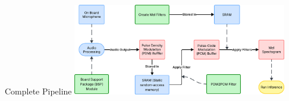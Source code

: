 \begin{frame}{Complete Pipeline}
    \centering
    \includegraphics[height=0.7\textheight,width=0.7\textwidth,keepaspectratio]{pipeline.png}
\end{frame}
